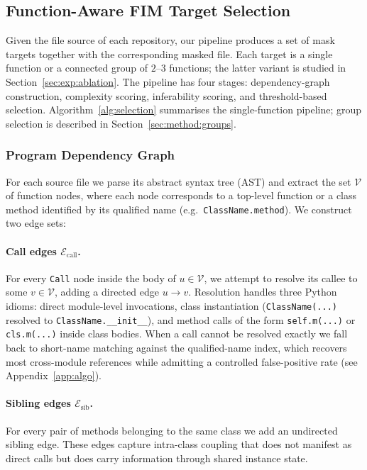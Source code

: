 \subsection{Function-Aware FIM Target Selection}
\label{sec:method:selection}

Given the file source of each repository, our pipeline produces a set of
mask targets together with the corresponding masked file. Each target is
a single function or a connected group of $2$--$3$ functions; the latter
variant is studied in Section~\ref{sec:exp:ablation}. The pipeline has four
stages: dependency-graph construction, complexity scoring, inferability
scoring, and threshold-based selection. Algorithm~\ref{alg:selection}
summarises the single-function pipeline; group selection is described
in Section~\ref{sec:method:groups}.

\subsubsection{Program Dependency Graph}
\label{sec:method:pdg}

For each source file we parse its abstract syntax tree (AST) and extract
the set $\mathcal{V}$ of function nodes, where each node corresponds to a
top-level function or a class method identified by its qualified name
(e.g.\ \texttt{ClassName.method}). We construct two edge sets:

\paragraph{Call edges $\mathcal{E}_{\text{call}}$.}
For every \texttt{Call} node inside the body of $u \in \mathcal{V}$, we
attempt to resolve its callee to some $v \in \mathcal{V}$, adding a directed
edge $u \to v$. Resolution handles three Python idioms:
direct module-level invocations, class instantiation
(\texttt{ClassName(...)} resolved to \texttt{ClassName.\_\_init\_\_}), and
method calls of the form \texttt{self.m(...)} or \texttt{cls.m(...)}
inside class bodies. When a call cannot be resolved exactly we fall back to
short-name matching against the qualified-name index, which recovers most
cross-module references while admitting a controlled false-positive rate
(see Appendix~\ref{app:algo}).

\paragraph{Sibling edges $\mathcal{E}_{\text{sib}}$.}
For every pair of methods belonging to the same class we add an undirected
sibling edge. These edges capture intra-class coupling that does not
manifest as direct calls but does carry information through shared
instance state.

